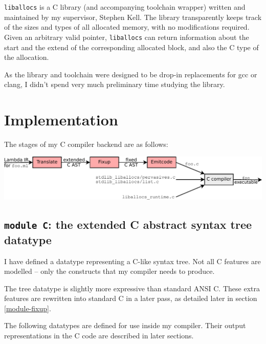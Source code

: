 \documentclass[12pt,a4paper,twoside,openright]{report}
\begin{document}
\lstinline!liballocs! is a C library (and accompanying toolchain wrapper)
written and maintained by my supervisor, Stephen Kell. The library transparently
keeps track of the sizes and types of all allocated memory, with no
modifications required. Given an arbitrary valid pointer, \lstinline!liballocs!
can return information about the start and the extend of the corresponding
allocated block, and also the C type of the allocation.

As the library and toolchain were designed to be drop-in replacements for gcc or
clang, I didn't spend very much preliminary time studying the library.

\chapter{Implementation}

The stages of my C compiler backend are as follows:

\begin{center}
  \includegraphics[width=16cm]{compiler_structure}
\end{center}

\section{\texttt{module C}: the extended C abstract syntax tree datatype}\label{module-c}

I have defined a datatype representing a C-like syntax tree. Not all C features
are modelled -- only the constructs that my compiler needs to produce.

The tree datatype is slightly more expressive than standard ANSI C. These extra
features are rewritten into standard C in a later pass, as detailed later in
section \ref{module-fixup}.

The following datatypes are defined for use inside my compiler. Their output representations in the C code are described in later sections.
\end{document}
